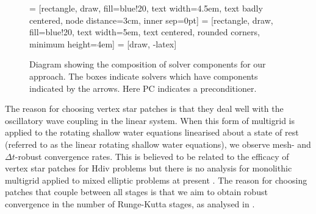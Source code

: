 \documentclass[a4paper, 12pt]{article}
\newcommand{\revisedus}[1]{#1}
\begin{document}
\begin{figure}
 = [rectangle, draw, fill=blue!20, 
    text width=4.5em, text badly centered, node distance=3cm, inner sep=0pt]
 = [rectangle, draw, fill=blue!20, 
    text width=5em, text centered, rounded corners, minimum height=4em]
 = [draw, -latex]

 \revisedus{\caption{\label{fig:solver_diag}Diagram showing the
    composition of solver components for our approach. The boxes
    indicate solvers which have components indicated by the
    arrows. Here PC indicates a preconditioner.}}
\end{figure}

The reason for choosing vertex star patches is that they deal well
with the oscillatory wave coupling in the linear system. When this
form of multigrid is applied to the rotating shallow water equations
linearised about a state of rest (referred to as the linear rotating
shallow water equations), we observe mesh- and $\Delta t$-robust
convergence rates.
This is believed to be related to the efficacy of
vertex star patches for Hdiv problems \citep{arnold2000multigrid} but
there is no analysis for monolithic multigrid applied to mixed
elliptic problems at present \citep{sm}. The reason for choosing patches
that couple between all stages is that we aim to obtain robust
convergence in the number of Runge-Kutta stages, as analysed in
\citep{kirby2024convergence}.
\end{document}
